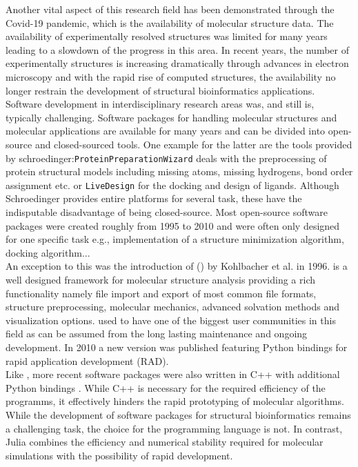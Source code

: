 Another vital aspect of this research field has been demonstrated through the Covid-19 pandemic, which is the availability of molecular structure data. The availability of experimentally resolved structures was limited for many years leading to a slowdown of the progress in this area.  In recent years, the number of experimentally structures is increasing dramatically through advances in electron microscopy and with the rapid rise of computed structures, the availability no longer restrain the development of structural bioinformatics applications.  \\
Software development in interdisciplinary research areas was, and still is, typically challenging. Software packages for handling molecular structures and molecular applications are available for many years and can be divided into open-source and closed-sourced tools. One example for the latter are the tools provided by schroedinger:\texttt{ProteinPreparationWizard} deals with the preprocessing of protein structural models including missing atoms, missing hydrogens, bond order assignment etc. or \texttt{LiveDesign} for the docking and design of ligands. Although Schroedinger provides entire platforms for several task, these have the indisputable disadvantage of being closed-source. 
Most open-source software packages were created roughly from 1995 to 2010 and were often only designed for one specific task e.g., implementation of a structure minimization algorithm, docking algorithm...  \\
An exception to this was the introduction of \ballFull (\ball) by Kohlbacher et al. in 1996.  \ball is a well designed framework for molecular structure analysis providing a rich functionality namely file import and export of most common file formats, structure preprocessing, molecular mechanics, advanced solvation methods and visualization options. \ball used to have one of the biggest user communities in this field as can be assumed from the long lasting maintenance and ongoing development. In 2010 a new version was published featuring Python bindings for rapid application development (RAD). \\
Like \ball, more recent software packages were also written in C++ with additional Python bindings \cite{Doerr2016HTMD}. While C++ is necessary for the required efficiency of the programms, it effectively hinders the rapid prototyping of molecular algorithms.  \\

While the development of software packages for structural bioinformatics remains a challenging task, the choice for the programming language is not. In contrast, Julia combines the efficiency and numerical stability required for molecular simulations with the possibility of rapid development. \\

